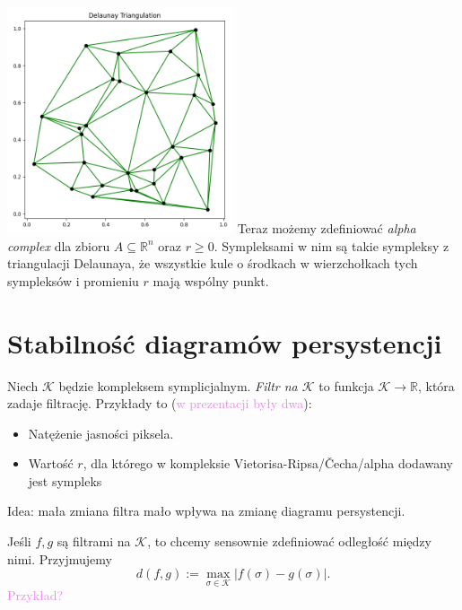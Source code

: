 \documentclass{beamer}
\newcommand{\comment}[1]{\textcolor{violet}{#1}}
\begin{document}
\begin{frame}
    {
    \centering
    \includegraphics[width=0.50\textwidth]{images/delaunay.png}
    }
    \pause
    \vspace{12pt}
    Teraz możemy zdefiniować \emph{alpha complex} dla zbioru $A \subseteq \mathbb{R}^n$
    oraz $r \geq 0$.
    Sympleksami w nim są takie sympleksy z triangulacji Delaunaya, że
    wszystkie kule o środkach w wierzchołkach tych sympleksów i promieniu $r$
    mają wspólny punkt.
\end{frame}

\section{Stabilność diagramów persystencji}
\begin{frame}[Idea]
  Niech $\mathcal{K}$ będzie kompleksem symplicjalnym.
  \emph{Filtr na $\mathcal{K}$}
  to funkcja $\mathcal{K} \to \mathbb{R}$, która zadaje filtrację.
  Przykłady to (\comment{w prezentacji były dwa}):
  \begin{itemize}
    \pause\item Natężenie jasności piksela.
    \pause\item Wartość $r$, dla którego w kompleksie Vietorisa-Ripsa/Čecha/alpha
      dodawany jest sympleks
  \end{itemize}
  \pause
  Idea: mała zmiana filtra mało wpływa na zmianę diagramu persystencji.
\end{frame}

\begin{frame}
  Jeśli $f, g$ są filtrami na $\mathcal{K}$, to chcemy sensownie zdefiniować
  odległość między nimi. Przyjmujemy
  \[
    d(f,g):=\max_{\sigma \in \mathcal{K}} \lvert f(\sigma) - g(\sigma) \rvert.
  \]
  \comment{Przykład?}
\end{frame}
\end{document}
